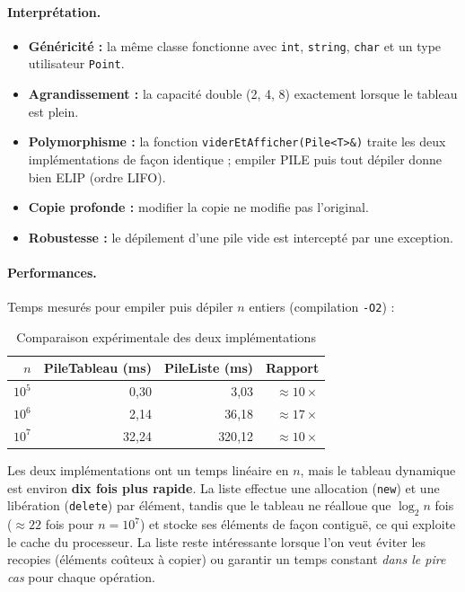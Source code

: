 \documentclass[11pt,a4paper]{article}
\newcommand{\code}[1]{\texttt{#1}}
\begin{document}
\paragraph{Interprétation.}
\begin{itemize}
  \item \textbf{Généricité :} la même classe fonctionne avec \code{int},
        \code{string}, \code{char} et un type utilisateur \code{Point}.
  \item \textbf{Agrandissement :} la capacité double (2, 4, 8) exactement
        lorsque le tableau est plein.
  \item \textbf{Polymorphisme :} la fonction \code{viderEtAfficher(Pile<T>\&)}
        traite les deux implémentations de façon identique ; empiler
        \og PILE \fg{} puis tout dépiler donne bien \og ELIP \fg{} (ordre LIFO).
  \item \textbf{Copie profonde :} modifier la copie ne modifie pas l'original.
  \item \textbf{Robustesse :} le dépilement d'une pile vide est intercepté par
        une exception.
\end{itemize}

\paragraph{Performances.} Temps mesurés pour empiler puis dépiler $n$
entiers (compilation \code{-O2}) :

\begin{table}[H]
\centering
\begin{tabular}{rrrr}
  \toprule
  $n$ & \textbf{PileTableau} (ms) & \textbf{PileListe} (ms) & \textbf{Rapport} \\
  \midrule
  $10^5$ & 0{,}30  & 3{,}03   & $\approx 10\times$ \\
  $10^6$ & 2{,}14  & 36{,}18  & $\approx 17\times$ \\
  $10^7$ & 32{,}24 & 320{,}12 & $\approx 10\times$ \\
  \bottomrule
\end{tabular}
\caption{Comparaison expérimentale des deux implémentations}
\end{table}

Les deux implémentations ont un temps linéaire en $n$, mais le tableau
dynamique est environ \textbf{dix fois plus rapide}. La liste effectue une
allocation (\code{new}) et une libération (\code{delete}) par élément,
tandis que le tableau ne réalloue que $\log_2 n$ fois ($\approx 22$ fois
pour $n = 10^7$) et stocke ses éléments de façon contiguë, ce qui exploite
le cache du processeur. La liste reste intéressante lorsque l'on veut éviter
les recopies (éléments coûteux à copier) ou garantir un temps constant
\emph{dans le pire cas} pour chaque opération.
\end{document}
